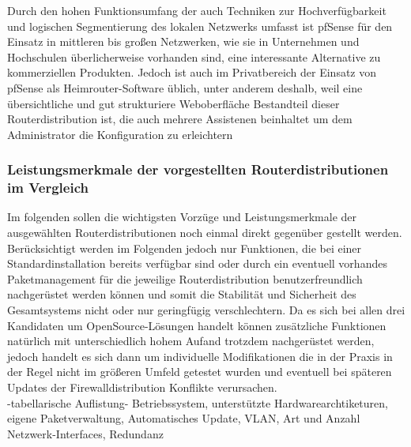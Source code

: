 \documentclass[a4paper,12pt]{scrartcl}
\begin{document}
Durch den hohen Funktionsumfang der auch Techniken zur Hochverf\"ugbarkeit und
logischen Segmentierung des lokalen Netzwerks umfasst ist pfSense f\"ur den
Einsatz in mittleren bis gro\ss{}en Netzwerken, wie sie in Unternehmen und
Hochschulen \"uberlicherweise vorhanden sind, eine interessante Alternative zu
kommerziellen Produkten. Jedoch ist auch im Privatbereich der Einsatz von
pfSense als Heimrouter-Software \"ublich, unter anderem deshalb, weil eine
\"ubersichtliche und gut strukturiere Weboberfl\"ache Bestandteil dieser
Routerdistribution ist, die auch mehrere Assistenen beinhaltet um dem
Administrator die Konfiguration zu erleichtern

\subsubsection{Leistungsmerkmale der vorgestellten Routerdistributionen im
Vergleich}
Im folgenden sollen die wichtigsten Vorz\"uge und Leistungsmerkmale der
ausgew\"ahlten Routerdistributionen noch einmal direkt gegen\"uber gestellt
werden.\\


Ber\"ucksichtigt werden im Folgenden jedoch nur Funktionen, die bei einer
Standardinstallation bereits verf\"ugbar sind oder durch ein eventuell
vorhandes Paketmanagement f\"ur die jeweilige Routerdistribution
benutzerfreundlich nachger\"ustet werden k\"onnen und somit die Stabilit\"at
und Sicherheit des Gesamtsystems nicht oder nur geringf\"ugig verschlechtern.
Da es sich bei allen drei Kandidaten um OpenSource-L\"osungen handelt k\"onnen
zus\"atzliche Funktionen nat\"urlich mit unterschiedlich hohem Aufand trotzdem
nachger\"ustet werden, jedoch handelt es sich dann um individuelle
Modifikationen die in der Praxis in der Regel nicht im gr\"o\ss{}eren Umfeld
getestet wurden und eventuell bei sp\"ateren Updates der Firewalldistribution
Konflikte verursachen.\\

-tabellarische Auflistung-
Betriebssystem, unterst\"utzte Hardwarearchtiketuren, eigene Paketverwaltung,
Automatisches Update, VLAN, Art und Anzahl Netzwerk-Interfaces, Redundanz\\
\end{document}

